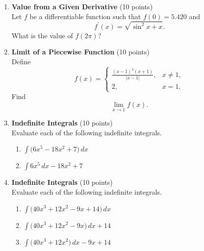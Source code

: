 \begin{enumerate}
  \item \textbf{Value from a Given Derivative} (10 points)\\
  Let $f$ be a differentiable function such that $f(0)=5.420$ and
  \[
    f^{\prime}(x)=\sqrt{\sin^2 x + x}.
  \]
  What is the value of $f(2\pi)$?
  \begin{subanswer}
  \end{subanswer}

  \item \textbf{Limit of a Piecewise Function} (10 points)\\
  Define
  \[
    f(x) =
    \begin{cases}
      \displaystyle \frac{(x-1)^2 (x+1)}{|x-1|}, & x \neq 1,\\[8pt]
      2, & x=1.
    \end{cases}
  \]
  Find
  \[
    \lim_{x\to 1} f(x).
  \]
  \begin{subanswer}
  \end{subanswer}





  \newpage

  \item \textbf{Indefinite Integrals} (10 points)\\
  Evaluate each of the following indefinite integrals.
  \begin{enumerate}[label=(\alph*)]
    \item $\displaystyle \int \bigl(6 x^5 - 18 x^2 + 7\bigr) \,dx$
    \item $\displaystyle \int 6 x^5 \,dx - 18 x^2 + 7$
  \end{enumerate}
  \begin{subanswer}
  \end{subanswer}

  \item \textbf{Indefinite Integrals} (10 points)\\
  Evaluate each of the following indefinite integrals.
  \begin{enumerate}[label=(\alph*)]
    \item $\displaystyle \int \bigl(40 x^3 + 12 x^2 - 9 x + 14\bigr) \,dx$
    \item $\displaystyle \int \bigl(40 x^3 + 12 x^2 - 9 x\bigr) \,dx + 14$
    \item $\displaystyle \int \bigl(40 x^3 + 12 x^2\bigr) \,dx - 9 x + 14$
  \end{enumerate}
  \begin{subanswer}
  \end{subanswer}


\end{enumerate}
